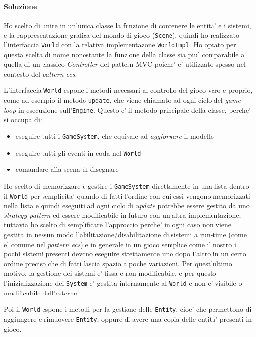 \documentclass[a4paper,12pt]{report}
\begin{document}
\paragraph*{Soluzione}
Ho scelto di unire in un'unica classe la funzione di contenere le entita' e i sistemi, e la rappresentazione grafica del mondo di gioco (\texttt{Scene}), quindi ho realizzato l'interfaccia \texttt{World} con la relativa implementazone \texttt{WorldImpl}. Ho optato per questa scelta di nome nonostante la funzione della classe sia piu' comparabile a quella di un classico \textit{Controller} del pattern MVC poiche' e' utilizzato spesso nel contesto del \textit{pattern ecs}.

L'interfaccia \texttt{World} espone i metodi necessari al controllo del gioco vero e proprio, come ad esempio il metodo \texttt{update}, che viene chiamato ad ogni ciclo del \textit{game loop} in esecuzione sull'\texttt{Engine}. Questo e' il metodo principale della classe, perche' si occupa di:

\begin{itemize}
	\item eseguire tutti i \texttt{GameSystem}, che equivale ad \textit{aggiornare} il modello
	\item eseguire tutti gli eventi in coda nel \texttt{World}
	\item comandare alla scena di disegnare
\end{itemize}

Ho scelto di memorizzare e gestire i \texttt{GameSystem} direttamente in una lista dentro il \texttt{World} per semplicita' quando di fatti l'ordine con cui essi vengono memorizzati nella lista e quindi eseguiti ad ogni ciclo di \textit{update} potrebbe essere gestito da uno \textit{strategy pattern} ed essere modificabile in futuro con un'altra implementazione; tuttavia ho scelto di semplificare l'approccio perche' in ogni caso non viene gestita in nessun modo l'abilitazione/disabilitazione di sistemi a run-time (come e' comune nel \textit{pattern ecs}) e in generale in un gioco semplice come il nostro i pochi sistemi presenti devono eseguire strettamente uno dopo l'altro in un certo ordine preciso che di fatti lascia spazio a poche variazioni. Per quest'ultimo motivo, la gestione dei sistemi e' fissa e non modificabile, e per questo l'inizializzazione dei \texttt{System} e' gestita internamente al \texttt{World} e non e' visibile o modificabile dall'esterno.

Poi il \texttt{World} espone i metodi per la gestione delle \texttt{Entity}, cioe' che permettono di aggiungere e rimuovere \texttt{Entity}, oppure di avere una copia delle entita' presenti in gioco.
\end{document}
